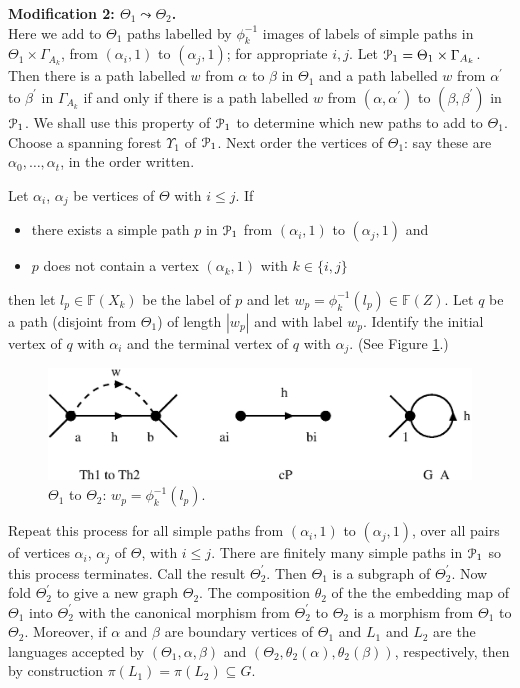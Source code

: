 \documentclass[a4paper,12pt]{article}
\renewcommand{\a}{\alpha }
\renewcommand{\b}{\beta }
\newcommand{\G}{\Gamma }
\newcommand{\T}{\Theta }
\newcommand{\U}{\Upsilon }
\newcommand{\cP}{{\cal{P}}}
\numberwithin{equation}{section}
\numberwithin{figure}{section}
\newcommand{\FF}{\ensuremath{\mathbb{F}}}
\begin{document}
\noindent\textbf{Modification 2: $\T_1\leadsto \T_2$.}\\
Here we add to $\T_1$ paths labelled by $\phi_k^{-1}$ images of labels of simple
paths in $\T_1\times \G_{A_k}$, from $(\a_i,1)$ to $(\a_j,1)$; for 
appropriate $i,j$. 
 Let $\cP_1=\T_1\times \G_{A_k}$. Then there is a path
 labelled $w$ from $\a$ to $\b$
in $\T_1$ and a path labelled $w$ from $\a^\prime $
to $\b^\prime$ in $\G_{A_k}$ if and only if there is a path
labelled $w$ from $(\a,\a^\prime)$ to $(\b,\b^\prime)$ in $\cP_1$.
 We shall
use this property of $\cP_1$ to determine which new paths to add  to
$\T_1$. Choose a spanning  forest $\U_1$ of  $\cP_1$. Next
 order the vertices of
$\T_1$: say these are $\a_0,\ldots, \a_t$, in the order written.

Let $\a_i$, $\a_j$ be vertices of  $\T$  with $i\le j$. If
\begin{itemize}
\item
 there
exists a simple path $p$ in $\cP_1$ from $(\a_i,1)$ to $(\a_j,1)$ and
\item 
$p$ does not contain a vertex $(\a_k,1)$ with $k\in\{i,j\}$
\end{itemize}
then let $l_p\in \FF(X_k)$ be the label of $p$ and let
$w_p=\phi_k^{-1}(l_p)\in \FF(Z)$. Let $q$ be a path (disjoint from
$\T_1$) of length $|w_p|$ and with label $w_p$. Identify the
initial vertex of $q$ with $\a_i$ and the terminal vertex of $q$
with $\a_j$. (See Figure \ref{fig:alg2-2}.)
\begin{figure}
\begin{center}
\psfrag{a}{$\a$}
\psfrag{b}{$\b$}
\psfrag{ai}{$(\a_i,1)$}
\psfrag{bi}{$(\a_j,1)$}
\psfrag{Th1 to Th2}{$\T_1\leadsto \T_2$}
\psfrag{cP}{$\cP_1$}
\psfrag{G_A}{$\G_{A_k}$}
\includegraphics[scale=.5]{alg2-2.eps}
\end{center}
\caption{$\Theta_1$ to $\Theta_2$: $w_p=\phi_k^{-1}(l_p)$.}\label{fig:alg2-2}
\end{figure}
Repeat this process for all simple paths from  $(\a_i,1)$ to
$(\a_j,1)$, over all pairs of vertices $\a_i$, $\a_j$ of $\T$,
with $i\le j$. There are finitely many simple paths in $\cP_1$ so
this process terminates. Call the result $\T_2^\prime$. Then
$\T_1$ is a subgraph of $\T_2^\prime$. Now fold $\T_2^\prime$ to
give a new graph $\T_2$. The composition $\theta_2$ of the the
embedding map of $\T_1$ into $\T_2^\prime$ with the canonical
morphism from $\T_2^\prime$ to $\T_2$ is a morphism from $\T_1$ to
$\T_2$.
 Moreover, if $\a$ and
 $\b$ are
boundary vertices of $\T_1$ and $L_1$ and $L_2$ are the
languages accepted by $(\T_1,\a,\b)$ and
$(\T_2,\theta_2(\a),\theta_2(\b))$, respectively, then
by construction $\pi(L_1)=\pi(L_2)\subseteq G$.\\[1em]
\end{document}
